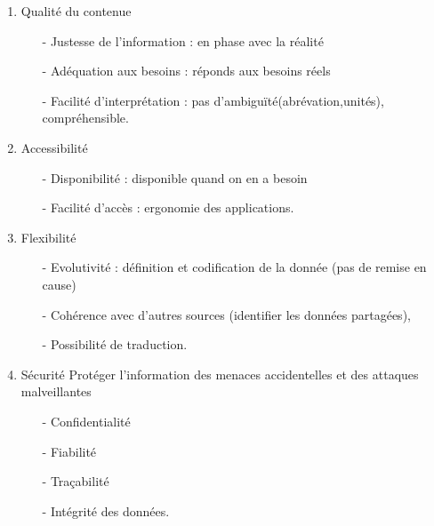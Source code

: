 \begin{enumerate}
\item {Qualité du contenue}
\begin{itemize}
\item[-]Justesse de l’information : en phase avec la réalité
\item[-]Adéquation aux besoins : réponds aux besoins réels
\item[-]Facilité d'interprétation : pas d'ambiguïté(abrévation,unités), compréhensible.
\end{itemize}
\item {Accessibilité}
\begin{itemize}
\item[-]Disponibilité : disponible quand on en a besoin
\item[-]Facilité d’accès : ergonomie des applications.
\end{itemize}
\item {Flexibilité}
\begin{itemize}
\item[-]Evolutivité : définition et codification de la donnée (pas de remise en cause) 
\item[-]Cohérence avec d’autres sources (identifier les données partagées), 
\item[-]Possibilité de traduction.
\end{itemize}
\item {Sécurité}
Protéger l’information des menaces accidentelles et des attaques malveillantes
\begin{itemize}
\item[-]Confidentialité 
\item[-]Fiabilité 
\item[-]Traçabilité
\item[-]Intégrité des données.
\end{itemize}
\end{enumerate}

